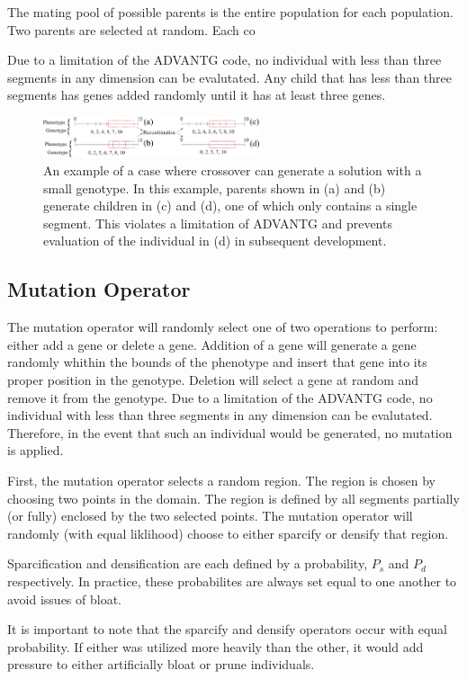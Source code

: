 \documentclass[conference]{IEEEtran}
\begin{document}
The mating pool of possible parents is the entire population for each population. Two parents are selected at random. Each co

Due to a limitation of the ADVANTG code, no individual with less than three segments in any dimension can be evalutated. Any child that has less than three segments has genes added randomly until it has at least three genes.
\begin{figure}[!t]
\centering
\includegraphics[width=2.5in]{emptyxover}
\caption{An example of a case where crossover can generate a solution with a small genotype. In this example, parents shown in (a) and (b) generate children in (c) and (d), one of which only contains a single segment. This violates a limitation of ADVANTG and prevents evaluation of the individual in (d) in subsequent development.}
\label{fig_sim}
\end{figure}

\subsection{Mutation Operator}
The mutation operator will randomly select one of two operations to perform: either add a gene or delete a gene. Addition of a gene will generate a gene randomly whithin the bounds of the phenotype and insert that gene into its proper position in the genotype. Deletion will select a gene at random and remove it from the genotype. Due to a limitation of the ADVANTG code, no individual with less than three segments in any dimension can be evalutated. Therefore, in the event that such an individual would be generated, no mutation is applied.

First, the mutation operator selects a random region. The region is chosen by choosing two points in the domain. The region is defined by all segments partially (or fully) enclosed by the two selected points. The mutation operator will randomly (with equal liklihood) choose to either sparcify or densify that region.

Sparcification and densification are each defined by a probability, $P_s$ and $P_d$ respectively. In practice, these probabilites are always set equal to one another to avoid issues of bloat.

It is important to note that the sparcify and densify operators occur with equal probability. If either was utilized more heavily than the other, it would add pressure to either artificially bloat or prune individuals.
\end{document}
